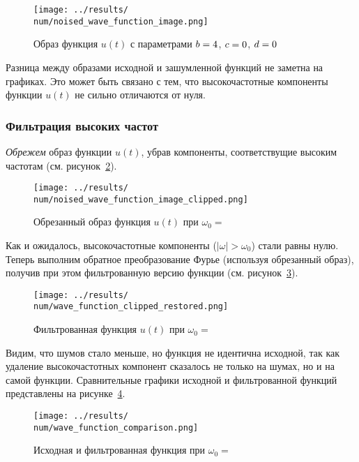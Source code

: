 \begin{figure}[ht!]
    \centering
    \texttt{[image: ../results/\\num/noised\_wave\_function\_image.png]}
    \caption{Образ функция $u(t)$ с параметрами $b = 4$, $c = 0$, $d = 0$}
    \label{fig:noised_wave_function_image_\num}
\end{figure}

Разница между образами исходной и зашумленной функций не заметна на графиках. 
Это может быть связано с тем, что высокочастотные компоненты функции $u(t)$ не сильно отличаются от нуля.

\FloatBarrier
\subsubsection{Фильтрация высоких частот}
\textit{Обрежем} образ функции $u(t)$, убрав компоненты, соответствущие высоким частотам (см. рисунок~\ref{fig:noised_wave_function_image_clipped_\num}).

\begin{figure}[ht!]
    \centering
    \texttt{[image: ../results/\\num/noised\_wave\_function\_image\_clipped.png]}
    \caption{Обрезанный образ функция $u(t)$ при $\omega_0=$~\imageclip}
    \label{fig:noised_wave_function_image_clipped_\num}
\end{figure}

Как и ожидалось, высокочастотные компоненты ($|\omega| > \omega_0$) стали равны нулю. 
Теперь выполним обратное преобразование Фурье (используя обрезанный образ), получив при этом фильтрованную версию функции (см. рисунок~\ref{fig:wave_function_clipped_restored_\num}).

\begin{figure}[ht!]
    \centering
    \texttt{[image: ../results/\\num/wave\_function\_clipped\_restored.png]}
    \caption{Фильтрованная функция $u(t)$ при $\omega_0=$~\imageclip}
    \label{fig:wave_function_clipped_restored_\num}
\end{figure}

Видим, что шумов стало меньше, но функция не идентична исходной, так как удаление высокочастотных компонент сказалось не только на шумах, но и на самой функции. 
Сравнительные графики исходной и фильтрованной функций представлены на рисунке~\ref{fig:wave_function_comparison_\num}. 
\begin{figure}[ht!]
    \centering
    \texttt{[image: ../results/\\num/wave\_function\_comparison.png]}
    \caption{Исходная и фильтрованная функция при $\omega_0=$~\imageclip}
    \label{fig:wave_function_comparison_\num}
\end{figure}

